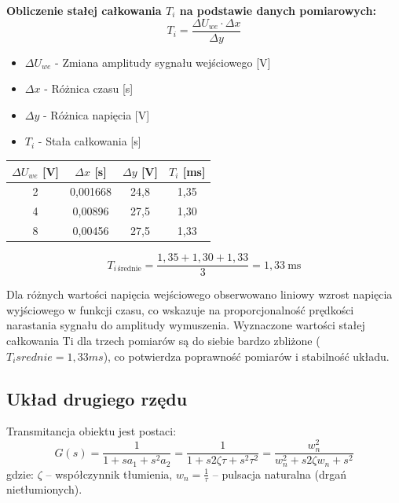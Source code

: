 \documentclass[12pt,a4paper]{article}
\begin{document}
	\textbf{Obliczenie stałej całkowania $T_i$ na podstawie danych pomiarowych:}
	\[
	T_i = \frac{\Delta U_{we} \cdot \Delta x}{\Delta y}
	\]
	\begin{itemize}
		\item $\Delta U_{we}$ - Zmiana amplitudy sygnału wejściowego [V]
		\item $\Delta x$ - Różnica czasu [s]
		\item $\Delta y$ - Różnica napięcia [V]
		\item $T_i$ - Stała całkowania [s]
	\end{itemize}
	
	\begin{table}[h!]
		\centering
		\begin{tabular}{|c|c|c|c|}
			\hline
			$\Delta U_{we}$ [V] & $\Delta x$ [s] & $\Delta y$ [V] & $T_i$ [ms] \\
			\hline
			2 & 0,001668 & 24,8 & 1,35 \\
			4 & 0,00896 & 27,5 & 1,30 \\
			8 & 0,00456 & 27,5 & 1,33 \\
			\hline
		\end{tabular}
	\end{table}
	
	\[
	T_{i\,\text{średnie}} = \frac{1,35 + 1,30 + 1,33}{3} = 1,33\ \text{ms}
	\]
	
	Dla różnych wartości napięcia wejściowego obserwowano liniowy wzrost napięcia wyjściowego w funkcji czasu, co wskazuje na proporcjonalność prędkości narastania sygnału do amplitudy wymuszenia. Wyznaczone wartości stałej całkowania Ti dla trzech pomiarów są do siebie bardzo zbliżone ($T_isrednie = 1,33 ms$), co potwierdza poprawność pomiarów i stabilność układu.
	
	\subsection{Układ drugiego rzędu}
	Transmitancja obiektu jest postaci:
	\begin{equation}
		G(s) = \frac{1}{1 + sa_1 + s^2a_2}
		= \frac{1}{1+s 2\zeta \tau + s^2 \tau^2}
		= \frac{w_n^2}{w_n^2 + s 2 \zeta w_n + s^2}
	\end{equation}
	gdzie: \(\zeta\) – współczynnik tłumienia, \(w_n = \frac{1}{\tau}\) – pulsacja naturalna (drgań nietłumionych).
	
\end{document}
